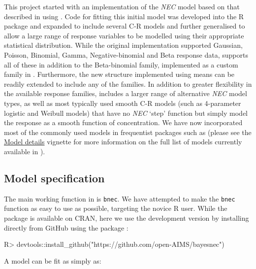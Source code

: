 \documentclass[
]{jss}
\begin{document}
This project started with an implementation of the \emph{NEC} model
based on that described in \citep{Fox2010, Pires2002} using 
\citep{Su2015}. Code for fitting this initial model was developed into
the R package  and expanded to include several C-R models
and further generalised to allow a large range of response variables to
be modelled using their appropriate statistical distribution. While the
original  implementation supported Gaussian, Poisson,
Binomial, Gamma, Negative-binomial and Beta response data,
 supports all of these in addition to the Beta-binomial
family, implemented as a custom family in . Furthermore, the
new structure implemented using  means  can be
readily extended to include any of the  families. In addition
to greater flexibility in the available response families,
 includes a larger range of alternative \emph{NEC} model
types, as well as most typically used smooth C-R models (such as
4-parameter logistic and Weibull models) that have no \emph{NEC} `step'
function but simply model the response as a smooth function of
concentration. We have now incorporated most of the commonly used models
in frequentist packages such as  \citep{Ritz2016} (please see
the
\href{https://open-aims.github.io/bayesnec/articles/example2b.html}{Model
details} vignette for more information on the full list of models
currently available in ).

\hypertarget{model-specification}{%
\subsection{Model specification}\label{model-specification}}

The main working function in  is \texttt{bnec}. We have
attempted to make the \texttt{bnec} function as easy to use as possible,
targeting the novice R user. While the package is available on CRAN,
here we use the development version by installing directly from GitHub
using the package :

\begin{CodeChunk}
\begin{CodeInput}
R> devtools::install_github("https://github.com/open-AIMS/bayesnec")
\end{CodeInput}
\end{CodeChunk}

\newpage

A  model can be fit as simply as:
\end{document}
